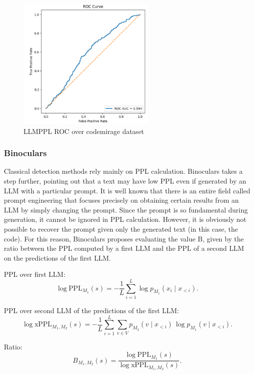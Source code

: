 \begin{figure}[H]
    \centering
    \includegraphics[width=0.6\textwidth]{img/LLMPPL/AUC.png}
    \caption{LLMPPL ROC over codemirage dataset}
    \label{fig:LLMPPL ROC over codemirage dataset}
\end{figure}



\subsubsection{Binoculars}
\newcommand{\PPL}{\mathrm{PPL}}
\newcommand{\xPPL}{\mathrm{xPPL}}
Classical detection methods rely mainly on PPL calculation. 
Binoculars takes a step further, pointing out that a text may 
have low PPL even if generated by an LLM with a particular prompt. 
It is well known that there is an entire field called prompt 
engineering that focuses precisely on obtaining certain results 
from an LLM by simply changing the prompt. Since the prompt is so 
fundamental during generation, it cannot be ignored in PPL calculation. 
However, it is obviously not possible to recover the prompt given only 
the generated text (in this case, the code). For this reason, 
Binoculars proposes evaluating the value 
B, given by the ratio between the PPL computed by a first LLM and the PPL of a second LLM on the predictions of the first LLM.

PPL over first LLM:
\[
\log \PPL_{M_1}(s)
= -\frac{1}{L}\sum_{i=1}^{L}\log p_{M_1}(x_i\mid x_{<i}).
\]

PPL over second LLM of the predictions of the first LLM:
\[
\log \xPPL_{M_1,M_2}(s)
= -\frac{1}{L}\sum_{i=1}^{L}\sum_{v\in V}
p_{M_2}(v\mid x_{<i})\,\log p_{M_1}(v\mid x_{<i}).
\]

Ratio:
\[
B_{M_1,M_2}(s)=\frac{\log \PPL_{M_1}(s)}{\log \xPPL_{M_1,M_2}(s)}.
\]

